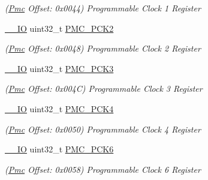 \begin{DoxyCompactItemize}
\begin{DoxyCompactList}\small\item\em (\mbox{\hyperlink{structPmc}{Pmc}} Offset\+: 0x0044) Programmable Clock 1 Register \end{DoxyCompactList}\item 
\mbox{\label{structPmc_a029b3a7d82185c6dc11bd5079f6f2dff}} 
\mbox{\hyperlink{core__cm7_8h_aec43007d9998a0a0e01faede4133d6be}{\+\_\+\+\_\+\+IO}} uint32\+\_\+t \mbox{\hyperlink{structPmc_a029b3a7d82185c6dc11bd5079f6f2dff}{P\+M\+C\+\_\+\+P\+C\+K2}}
\begin{DoxyCompactList}\small\item\em (\mbox{\hyperlink{structPmc}{Pmc}} Offset\+: 0x0048) Programmable Clock 2 Register \end{DoxyCompactList}\item 
\mbox{\label{structPmc_ad9d2184616c46f3f8e6b63f52adf600c}} 
\mbox{\hyperlink{core__cm7_8h_aec43007d9998a0a0e01faede4133d6be}{\+\_\+\+\_\+\+IO}} uint32\+\_\+t \mbox{\hyperlink{structPmc_ad9d2184616c46f3f8e6b63f52adf600c}{P\+M\+C\+\_\+\+P\+C\+K3}}
\begin{DoxyCompactList}\small\item\em (\mbox{\hyperlink{structPmc}{Pmc}} Offset\+: 0x004C) Programmable Clock 3 Register \end{DoxyCompactList}\item 
\mbox{\label{structPmc_ad014a7e5a1e35e077bdb3d32e71f5a11}} 
\mbox{\hyperlink{core__cm7_8h_aec43007d9998a0a0e01faede4133d6be}{\+\_\+\+\_\+\+IO}} uint32\+\_\+t \mbox{\hyperlink{structPmc_ad014a7e5a1e35e077bdb3d32e71f5a11}{P\+M\+C\+\_\+\+P\+C\+K4}}
\begin{DoxyCompactList}\small\item\em (\mbox{\hyperlink{structPmc}{Pmc}} Offset\+: 0x0050) Programmable Clock 4 Register \end{DoxyCompactList}\item 
\mbox{\label{structPmc_add52966c8b3c746a6d5d81e54652fe3b}} 
\mbox{\hyperlink{core__cm7_8h_aec43007d9998a0a0e01faede4133d6be}{\+\_\+\+\_\+\+IO}} uint32\+\_\+t \mbox{\hyperlink{structPmc_add52966c8b3c746a6d5d81e54652fe3b}{P\+M\+C\+\_\+\+P\+C\+K6}}
\begin{DoxyCompactList}\small\item\em (\mbox{\hyperlink{structPmc}{Pmc}} Offset\+: 0x0058) Programmable Clock 6 Register \end{DoxyCompactList}\item 

\end{DoxyCompactItemize}
